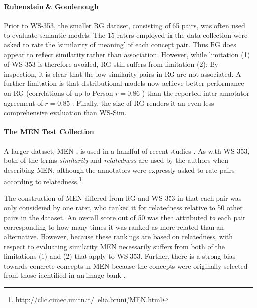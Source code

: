 \documentclass[fullname]{clv2}
\begin{document}
\paragraph{\bf Rubenstein \& Goodenough} Prior to WS-353, the smaller RG dataset, consisting of 65 pairs, was often used to evaluate semantic models. The 15 raters employed in the data collection were asked to rate the `similarity of meaning' of each concept pair. Thus RG does appear to reflect similarity rather than association. However, while limitation (1) of WS-353 is therefore avoided, RG still suffers from limitation (2): By inspection, it is clear that the low similarity pairs in RG are not associated. A further limitation is that distributional models now achieve better performance on RG (correlations of up to Person \( r = 0.86 \) \cite{hassan2011semantic}) than the reported inter-annotator agreement of \( r = 0.85 \) \cite{rubenstein1965contextual}. Finally, the size of RG renders it an even less comprehensive evaluation than WS-Sim. 

\paragraph{\bf The MEN Test Collection} A larger dataset, MEN \cite{bruni2012distributional}, is used in a handful of recent studies \cite{bruni2012distributional2,bernardi2013relatedness}. As with WS-353, both of the terms \emph{similarity} and \emph{relatedness} are used by the authors when describing MEN, although the annotators were expressly asked to rate pairs according to relatedness.\footnote{http://clic.cimec.unitn.it/~elia.bruni/MEN.html} 

The construction of MEN differed from RG and WS-353 in that each pair was only considered by one rater, who ranked it for relatedness relative to 50 other pairs in the dataset. An overall score out of 50 was then attributed to each pair corresponding to how many times it was ranked as more related than an alternative. However, because these rankings are based on relatedness, with respect to evaluating similarity MEN necessarily suffers from both of the limitations (1) and (2) that apply to WS-353. Further, there is a strong bias towards concrete concepts in MEN because the concepts were originally selected from those identified in an image-bank \cite{bruni2012distributional}.  
\end{document}
